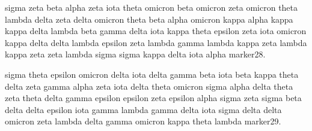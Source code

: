 \documentclass{article}
\begin{document}
sigma zeta beta alpha zeta iota theta omicron beta omicron zeta omicron theta lambda delta zeta delta omicron theta beta alpha omicron kappa alpha kappa kappa delta lambda beta gamma delta iota kappa theta epsilon zeta iota omicron kappa delta delta lambda epsilon zeta lambda gamma lambda kappa zeta lambda kappa zeta zeta lambda sigma sigma kappa delta iota alpha marker28.

sigma theta epsilon omicron delta iota delta gamma beta iota beta kappa theta delta zeta gamma alpha zeta iota delta theta omicron sigma alpha delta theta zeta theta delta gamma epsilon epsilon zeta epsilon alpha sigma zeta sigma beta delta delta epsilon iota gamma lambda gamma delta iota sigma delta delta omicron zeta lambda delta gamma omicron kappa theta lambda marker29.
\end{document}
